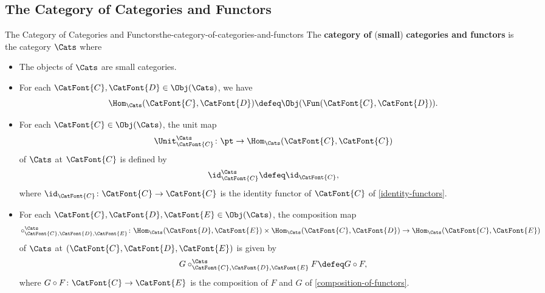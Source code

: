 \subsection{The Category of Categories and Functors}\label{subsection-the-category-of-categories-and-functors}
\begin{definition}{The Category of Categories and Functors}{the-category-of-categories-and-functors}%
    The \textbf{category of} (\textbf{small}) \textbf{categories and functors} is the category $\Cats$ where
    \begin{itemize}
        \item{}The objects of $\Cats$ are small categories.
        \item{}For each $\CatFont{C},\CatFont{D}\in\Obj(\Cats)$, we have
            \[
                \Hom_{\Cats}(\CatFont{C},\CatFont{D})
                \defeq
                \Obj(\Fun(\CatFont{C},\CatFont{D})).
            \]%
        \item{}For each $\CatFont{C}\in\Obj(\Cats)$, the unit map
            \[
                \Unit^{\Cats}_{\CatFont{C}}
                \colon
                \pt
                \to
                \Hom_{\Cats}(\CatFont{C},\CatFont{C})
            \]%
            of $\Cats$ at $\CatFont{C}$ is defined by
            \[
                \id^{\Cats}_{\CatFont{C}}
                \defeq
                \id_{\CatFont{C}},
            \]%
            where $\id_{\CatFont{C}}\colon\CatFont{C}\to\CatFont{C}$ is the identity functor of $\CatFont{C}$ of \cref{identity-functors}.
        \item{}For each $\CatFont{C},\CatFont{D},\CatFont{E}\in\Obj(\Cats)$, the composition map
            \[
                \circ^{\Cats}_{\CatFont{C},\CatFont{D},\CatFont{E}}
                \colon
                \Hom_{\Cats}(\CatFont{D},\CatFont{E})
                \times
                \Hom_{\Cats}(\CatFont{C},\CatFont{D})
                \to
                \Hom_{\Cats}(\CatFont{C},\CatFont{E})
            \]%
            of $\Cats$ at $(\CatFont{C},\CatFont{D},\CatFont{E})$ is given by
            \[
                G\mathbin{{\circ}^{\Cats}_{\CatFont{C},\CatFont{D},\CatFont{E}}}F
                \defeq
                G\circ F,
            \]%
            where $G\circ F\colon\CatFont{C}\to\CatFont{E}$ is the composition of $F$ and $G$ of \cref{composition-of-functors}.
    \end{itemize}
\end{definition}
